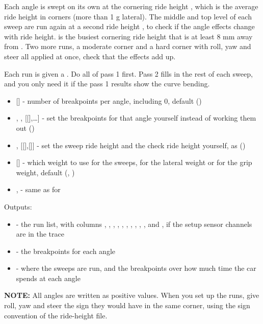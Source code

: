 Each angle is swept on its own at the cornering ride height , which is the average ride height in corners (more than 1 g lateral). The middle and top level of each sweep are run again at a second ride height , to check if the angle effects change with ride height.  is the busiest cornering ride height that is at least 8 mm away from . Two more runs, a moderate corner and a hard corner with roll, yaw and steer all applied at once, check that the effects add up.

Each run is given a . Do all of pass 1 first. Pass 2 fills in the rest of each sweep, and you only need it if the pass 1 results show the curve bending.
\begin{itemize}
    \item {} [] - number of breakpoints per angle, including 0, default  ()
    \item {}, ,  [[],\dots] - set the breakpoints for that angle yourself instead of working them out ()
    \item {},  [[],[]] - set the sweep ride height and the check ride height yourself, as  ()
    \item {} [] - which weight to use for the sweeps,  for the lateral weight or  for the grip weight, default  (, )
    \item {},  - same as for 
\end{itemize}
Outputs:
\begin{itemize}
    \item {} - the run list, with columns , , , , , , , , , , and ,  if the setup sensor channels are in the trace
    \item {} - the breakpoints for each angle
    \item {} - where the sweeps are run, and the breakpoints over how much time the car spends at each angle
\end{itemize}
\textbf{NOTE:} All angles are written as positive values. When you set up the runs, give roll, yaw and steer the sign they would have in the same corner, using the sign convention of the ride-height file.

